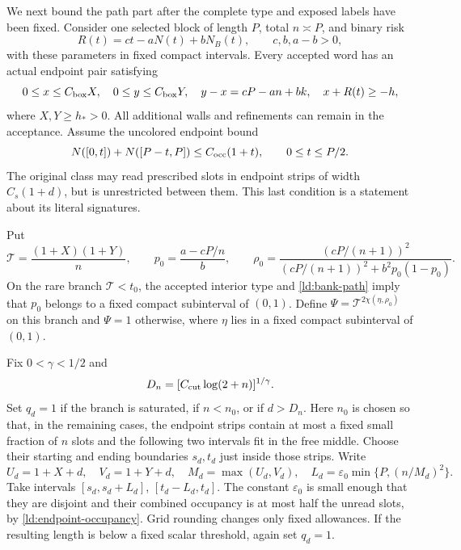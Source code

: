 We next bound the path part after the complete type and exposed labels
have been fixed.  Consider one selected block of length \(P\), total
\(n\asymp P\), and binary risk
\[
 R(t)=ct-aN(t)+bN_B(t),\qquad c,b,a-b>0,
\]
with these parameters in fixed compact intervals.  Every accepted word
has an actual endpoint pair satisfying
\begin{equation}
 0\le x\le C_{\rm box}X,\quad 0\le y\le C_{\rm box}Y,
 \quad y-x=cP-an+bk,\quad x+R(t)\ge-h,
 \label{ld:bank-path}
\end{equation}
where \(X,Y\ge h_*>0\).  All additional walls and refinements can
remain in the acceptance.  Assume the uncolored endpoint bound
\begin{equation}
 N([0,t])+N([P-t,P])\le C_{\rm occ}(1+t),
       \qquad 0\le t\le P/2.
 \label{ld:endpoint-occupancy}
\end{equation}
The original class may read prescribed slots in endpoint strips of
width \(C_s(1+d)\), but is unrestricted between them.  This last
condition is a statement about its literal signatures.

Put
\begin{equation}
 \mathcal T=\frac{(1+X)(1+Y)}n,\qquad
 p_0=\frac{a-cP/n}{b},\qquad
 \rho_0=\frac{(cP/(n+1))^2}
 {(cP/(n+1))^2+b^2p_0(1-p_0)}.
 \label{ld:bank-parameters}
\end{equation}
On the rare branch \(\mathcal T<t_0\), the accepted interior type
and \eqref{ld:bank-path} imply that \(p_0\) belongs to a fixed compact
subinterval of \((0,1)\).  Define
\(\Psi=\mathcal T^{2\chi(\eta,\rho_0)}\) on this branch and
\(\Psi=1\) otherwise, where \(\eta\) lies in a fixed compact
subinterval of \((0,1)\).

Fix \(0<\gamma<1/2\) and
\[
 D_n=[C_{\rm cut}\log(2+n)]^{1/\gamma}.
\]
Set \(q_d=1\) if the branch is saturated, if \(n<n_0\), or if
\(d>D_n\).  Here \(n_0\) is chosen so that, in the remaining cases,
the endpoint strips contain at most a fixed small fraction of \(n\)
slots and the following two intervals fit in the free middle.  Choose
their starting and ending boundaries \(s_d,t_d\) just inside those
strips.  Write
\begin{equation}
 U_d=1+X+d,\quad V_d=1+Y+d,\quad M_d=\max(U_d,V_d),\quad
 L_d=\varepsilon_0\min\{P,(n/M_d)^2\}.
 \label{ld:bank-length}
\end{equation}
Take intervals \([s_d,s_d+L_d]\), \([t_d-L_d,t_d]\).
The constant \(\varepsilon_0\) is small enough that they are disjoint
and their combined occupancy is at most half the unread slots, by
\eqref{ld:endpoint-occupancy}.  Grid rounding changes only fixed
allowances.  If the resulting length is below a fixed scalar threshold,
again set \(q_d=1\).

